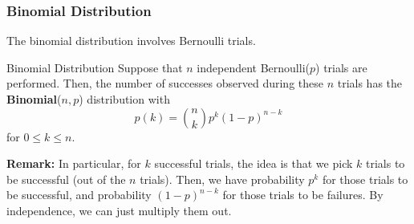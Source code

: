 \documentclass[letterpaper]{article}
\begin{document}
\subsubsection{Binomial Distribution}
The binomial distribution involves Bernoulli trials. 
\begin{definition}{Binomial Distribution}{}
    Suppose that $n$ independent Bernoulli($p$) trials are performed. Then, the number of successes observed during these $n$ trials has the \textbf{Binomial}($n, p$) distribution with 
    \[p(k) = \binom{n}{k} p^k (1 - p)^{n - k}\]
    for $0 \leq k \leq n$. 
\end{definition}
\textbf{Remark:} In particular, for $k$ successful trials, the idea is that we pick $k$ trials to be successful (out of the $n$ trials). Then, we have probability $p^k$ for those trials to be successful, and probability $(1 - p)^{n - k}$ for those trials to be failures. By independence, we can just multiply them out. 
\end{document}
